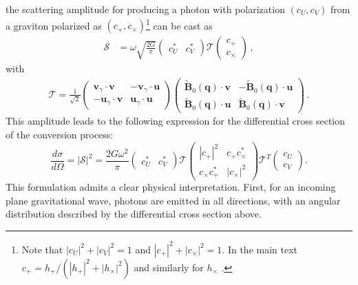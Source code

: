 \documentclass[a4paper,11pt]{article}
\begin{document}
%
the scattering amplitude for producing a photon with polarization $(c_U,c_V)$ from a graviton polarized as $(c_+,c_\times)$\footnote{Note that  $|c_U|^2+|c_V|^2 =1$ and $|c_+|^2+|c_\times|^2=1$. In the main text $c_+ = h_+/(|h_+|^2+|h_\times|^2)$ and similarly for $h_\times$ . }
can be cast as
%
\begin{align}
\mathcal{S} &= \omega \sqrt{\frac{2 G}{\pi}} 
\left(
\begin{array}{cc}
 c_U^* & c_V^*
\end{array}
\right)
\mathcal{T}
\left(
\begin{array}{c}
 c_+ \\ c_\times
\end{array}
\right)\,,
\end{align}
%
with
%
\begin{align}
\mathcal{T} =
\frac{1}{\sqrt2}
\left(
\begin{array}{cc}
 \bm{v}_\gamma \cdot \bm{v}   & -\bm{v}_\gamma \cdot \bm{u}  \\
 - \bm{u}_\gamma \cdot \bm{v}   & \bm{u}_\gamma \cdot \bm{u}
\end{array}
\right)
\left(
\begin{array}{cc}
 \tilde{\bm{B}}_0 (\bm{q}) \cdot \bm{v} & -\tilde{\bm{B}}_0 (\bm{q}) \cdot \bm{u} \\
 \tilde{\bm{B}}_0 (\bm{q}) \cdot \bm{u}  & \tilde{\bm{B}}_0 (\bm{q}) \cdot \bm{v}
\end{array}
\right)\,.
\label{eq:Tmat}
\end{align}
%
This amplitude leads to the following expression for the differential cross section of the conversion process:
%
\begin{equation}
\frac{d\sigma}{d\Omega} = |\mathcal{S}|^2 = \frac{2 G \omega^2}{\pi} 
\left(
\begin{array}{cc}
 c_U^* & c_V^*
\end{array}
\right)
\mathcal{T}
\left(
\begin{array}{cc}
 |c_+|^2 & c_+ c_\times^* \\
 c_\times c_+^* & |c_\times|^2
\end{array}
\right)
\mathcal{T}^T
\left(
\begin{array}{c}
 c_U \\ c_V
\end{array}
\right).
\label{eq:dsigmadOmegaS}
\end{equation}
%
This formulation admits a clear physical interpretation. First, for an incoming plane gravitational wave, photons are emitted in all directions, with an angular distribution described by the differential cross section above.
\end{document}

